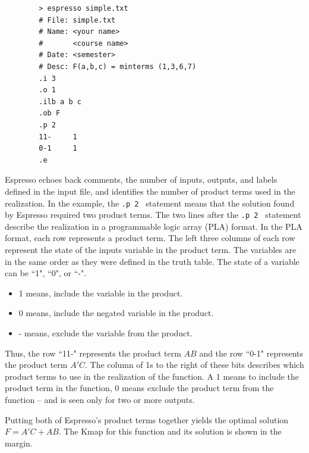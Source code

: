 \begin{process:minimizationKmap}
\begin{verbatim}
        > espresso simple.txt
        # File:	simple.txt
        # Name: <your name>
        #       <course name>
        # Date: <semester>
        # Desc:	F(a,b,c) = minterms (1,3,6,7)
        .i 3
        .o 1
        .ilb a b c
        .ob F
        .p 2
        11-     1
        0-1     1
        .e
\end{verbatim}

Espresso echoes back comments, the number of inputs, outputs, 
and labels defined in the input file,  and identifies the number of product
terms used in the realization.  In the example, the 
\verb+.p 2 + statement means that the solution found by Espresso 
required two product terms.  The two lines after the \verb+.p 2 + 
statement describe the realization in a programmable logic 
array (PLA) format.  In the PLA format, each row represents a 
product term.  The left three columns of each row represent the 
state of the inputs variable in the product term.  The variables 
are in the same order as they were defined in the truth table.
The state of a variable can be ``1", ``0", or ``-".
\begin{itemize}
\item 1 means, include the variable in the product.
\item 0 means, include the negated variable in the product.
\item - means, exclude the variable from the product.
\end{itemize}

Thus, the row ``11-" represents the product term $AB$ and the row ``0-1"
represents the product term $A'C$.  The column of 1s to the right 
of these bits describes which product terms to use in the realization
of the function.  A 1 means to include the product term in the 
function, 0 means exclude the product term from the function -- 
and is seen only for two or more outputs.

Putting both of Espresso's product terms together yields the
optimal solution $F=A'C+AB$.  The Kmap for this function and
its \SOPmin solution is shown in the margin.




\end{process:minimizationKmap}
